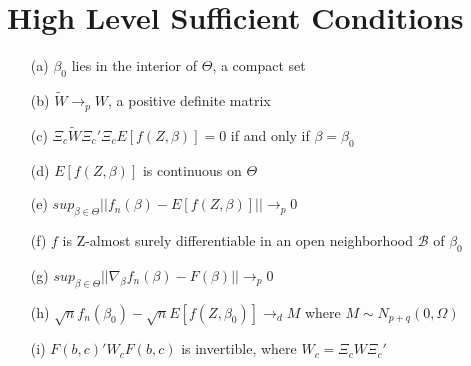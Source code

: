 \documentclass[11pt]{article}
\begin{document}



\doublespacing



\section*{High Level Sufficient Conditions}

\begin{itemize}
\item[(a)] $\beta_0$ lies in the interior of $\Theta$, a compact set
\item[(b)] $\widetilde{W} \rightarrow_{p} W$, a positive definite matrix
\item[(c)] $\Xi_c \widetilde{W} \Xi_c' \Xi_c E[f(Z, \beta)] = 0$ if and only if $\beta = \beta_0$
\item[(d)] $E[f(Z,\beta)]$ is continuous on $\Theta$
\item[(e)] $sup_{\beta\in \Theta} ||f_n(\beta) - E[f(Z,\beta)]||\rightarrow_p 0$
\item[(f)] $f$ is Z-almost surely differentiable in an open neighborhood $\mathcal{B}$ of $\beta_0$
\item[(g)] $sup_{\beta \in \Theta} ||\nabla_{\beta} f_n(\beta) - F(\beta)|| \rightarrow_p 0 $
\item[(h)] $\sqrt{n} f_n(\beta_0) - \sqrt{n} E[f(Z, \beta_0)] \rightarrow_d M $ where $M \sim N_{p+q} (0, \Omega)$ 
\item[(i)] $F(b,c)' W_c F(b,c)$ is invertible, where $W_c = \Xi_c W \Xi_c'$
\end{itemize}
\end{document}
